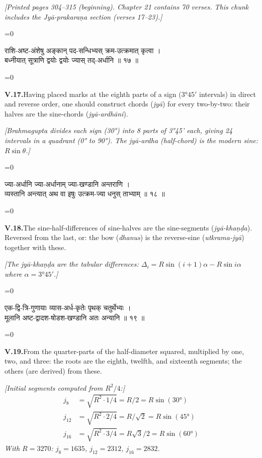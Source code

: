 \documentclass[11pt,a4paper]{article}
\newcommand{\cnote}[1]{\textcolor{notecolor}{\textit{#1}}}
\newcommand{\dev}[1]{{\devanagarifont\color{sktcolor}#1}}
\newcommand{\iast}[1]{\textit{#1}}
\newenvironment{paracol}[1]{\begingroup}{\endgroup}
\newcommand{\switchcolumn}[1][]{%
  \ifnum#1=0\relax\else\par\nobreak\vspace{0.5em}\par\nobreak\fi%
}
\begin{document}
\vspace{0.3cm}
\cnote{[Printed pages 304–315 (beginning). Chapter 21 contains 70 verses.
This chunk includes the Jyā-prakaraṇa section (verses 17–23).]}
\vspace{0.5cm}

\begin{paracol}{2}
\switchcolumn[0]
\dev{%
राशि-अष्ट-अंशेषु अङ्कान् पद-सन्धिभ्यस् क्रम-उत्क्रमात् कृत्वा ।\\
बध्नीयात् सूत्राणि द्वयोः द्वयोः ज्यास् तद्-अर्धानि ॥ १७ ॥
}

\switchcolumn[1]
\textbf{V.17.}\quad Having placed marks at the eighth parts of a
sign ($3°45'$ intervals) in direct and reverse order, one should
construct chords (\iast{jyā}) for every two-by-two: their halves
are the sine-chords (\iast{jyā-ardhāni}).

\medskip
\textit{[Brahmagupta divides each sign (30°) into 8 parts of 3°45'
each, giving 24 intervals in a quadrant (0° to 90°). The
\iast{jyā-ardha} (half-chord) is the modern sine: $R\sin\theta$.]}
\end{paracol}

\vspace{0.3cm}

\begin{paracol}{2}
\switchcolumn[0]
\dev{%
ज्या-अर्धानि ज्या-अर्धानाम् ज्या-खण्डानि अन्तराणि ।\\
व्यस्तानि अन्त्यात् अथ वा इषुः उत्क्रम-ज्या धनुस् ताभ्याम् ॥ १८ ॥
}

\switchcolumn[1]
\textbf{V.18.}\quad The sine-half-differences of sine-halves are
the sine-segments (\iast{jyā-khaṇḍa}). Reversed from the last,
or: the bow (\iast{dhanus}) is the reverse-sine
(\iast{utkrama-jyā}) together with these.

\medskip
\textit{[The \iast{jyā-khaṇḍa} are the tabular differences:
$\Delta_i = R\sin(i+1)\alpha - R\sin i\alpha$ where $\alpha = 3°45'$.]}
\end{paracol}

\vspace{0.3cm}

\begin{paracol}{2}
\switchcolumn[0]
\dev{%
एक-द्वि-त्रि-गुणायाः व्यास-अर्ध-कृतेः पृथक् चतुर्थेभ्यः ।\\
मूलानि अष्ट-द्वादश-षोडश-खण्डानि अतः अन्यानि ॥ १९ ॥
}

\switchcolumn[1]
\textbf{V.19.}\quad From the quarter-parts of the half-diameter
squared, multiplied by one, two, and three: the roots are the
eighth, twelfth, and sixteenth segments; the others (are derived)
from these.

\medskip
\textit{[Initial segments computed from $R^2/4$:]}
\begin{align*}
j_8 &= \sqrt{R^2 \cdot 1 / 4} = R/2 = R\sin(30°)\\
j_{12} &= \sqrt{R^2 \cdot 2 / 4} = R/\sqrt{2} = R\sin(45°)\\
j_{16} &= \sqrt{R^2 \cdot 3 / 4} = R\sqrt{3}/2 = R\sin(60°)
\end{align*}
\textit{With $R = 3270$: $j_8 = 1635$, $j_{12} = 2312$, $j_{16} = 2832$.}
\end{paracol}
\end{document}

